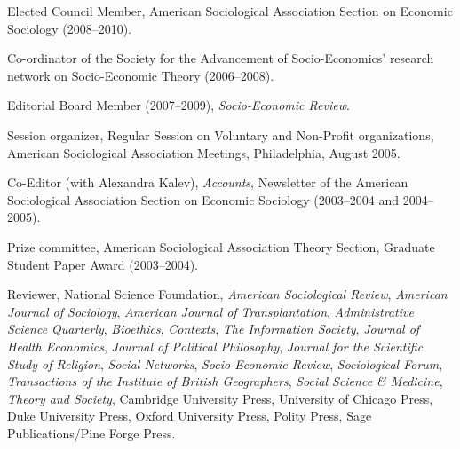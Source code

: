\documentclass[11pt]{article}
\begin{document}
\ind Elected Council Member, American Sociological Association Section on Economic
Sociology (2008--2010). 

\ind Co-ordinator of the Society for the Advancement of Socio-Economics' research network on Socio-Economic Theory (2006--2008). 

\ind Editorial Board Member (2007--2009), \emph{Socio-Economic Review}.

\ind Session organizer, Regular Session on Voluntary and Non-Profit organizations, American Sociological Association Meetings, Philadelphia, August 2005.

\ind Co-Editor (with Alexandra Kalev), \emph{Accounts}, Newsletter of the American Sociological Association Section on Economic Sociology (2003--2004 and 2004--2005).

\ind Prize committee, American Sociological Association Theory Section, Graduate Student Paper Award (2003--2004).

\ind Reviewer, National Science Foundation, \emph{American
  Sociological Review}, \emph{American Journal of Sociology},
\emph{American Journal of Transplantation}, \emph{Administrative
  Science Quarterly}, \emph{Bioethics}, \emph{Contexts}, \emph{The Information
  Society}, \emph{Journal of Health Economics}, \emph{Journal of Political Philosophy}, \emph{Journal for the Scientific Study of Religion}, \emph{Social Networks}, \emph{Socio-Economic Review}, \emph{Sociological Forum}, \emph{Transactions of the Institute of British Geographers}, \emph{Social Science \& Medicine}, \emph{Theory and Society}, Cambridge University Press, University of Chicago Press, Duke University Press, Oxford University Press, Polity Press, Sage Publications/Pine Forge Press.
\end{document}
